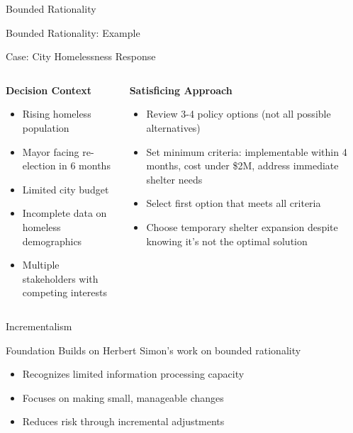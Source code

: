 \documentclass[10pt]{beamer}
\begin{document}
\begin{frame}{Bounded Rationality}
\begin{frame}{Bounded Rationality: Example}
\begin{block}{Case: City Homelessness Response}
\end{block}

\begin{columns}
\begin{column}{0.5\textwidth}
\textbf{Decision Context}
\begin{itemize}
\item Rising homeless population
\item Mayor facing re-election in 6 months
\item Limited city budget
\item Incomplete data on homeless demographics
\item Multiple stakeholders with competing interests
\end{itemize}
\end{column}
\begin{column}{0.5\textwidth}
\textbf{Satisficing Approach}
\begin{itemize}
\item Review 3-4 policy options (not all possible alternatives)
\item Set minimum criteria: implementable within 4 months, cost under \$2M, address immediate shelter needs
\item Select first option that meets all criteria
\item Choose temporary shelter expansion despite knowing it's not the optimal solution
\end{itemize}
\end{column}
\end{columns}
\end{frame}

\begin{frame}{Incrementalism}
\begin{center}
\end{center}

\vspace{0.5cm}
\begin{block}{Foundation}
Builds on Herbert Simon's work on bounded rationality
\begin{itemize}
\item Recognizes limited information processing capacity
\item Focuses on making small, manageable changes
\item Reduces risk through incremental adjustments
\end{itemize}
\end{block}
\end{frame}


\end{frame}
\end{document}
